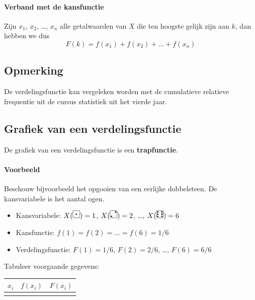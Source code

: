 \documentclass[a4paper,12pt, twoside]{article}
\newcommand{\dice}[1]{
\begin{tikzpicture}[x=1em,y=1em,radius=0.1]
  \draw[rounded corners=1] (0,0) rectangle (1,1);
  \ifodd#1
    \fill (0.5,0.5) circle;
  \fi
  \ifnum#1>1
    \fill (0.2,0.2) circle;
    \fill (0.8,0.8) circle;
   \ifnum#1>3
     \fill (0.2,0.8) circle;
     \fill (0.8,0.2) circle;
    \ifnum#1>5
      \fill (0.8,0.5) circle;
      \fill (0.2,0.5) circle;
    \fi
  \fi
\fi
\end{tikzpicture}
}
\begin{document}
\paragraph*{Verband met de kansfunctie}
Zijn $x_1$, $x_2$, \ldots, $x_n$ alle getalwaarden van $X$ die ten hoogste gelijk zijn aan $k$, dan hebben we dus
$$F(k) = f(x_1) + f(x_2) + \ldots + f(x_n)$$

\subsection{Opmerking}

De verdelingsfunctie kan vergeleken worden met de cumulatieve relatieve frequentie uit de cursus statistiek uit het vierde jaar.

\subsection{Grafiek van een verdelingsfunctie}

De grafiek van een verdelingsfunctie is een {\bf trapfunctie}.

\paragraph*{Voorbeeld} Beschouw bijvoorbeeld het opgooien van een eerlijke dobbelsteen. De kansvariabele is het aantal ogen.
\begin{itemize}
  \item Kansvariabele: $X(\dice{1})=1$, $X(\dice{2})=2$, \ldots, $X(\dice{6})=6$
  \item Kansfunctie: $f(1)=f(2)=\ldots=f(6)=1/6$
  \item Verdelingsfunctie: $F(1)=1/6$, $F(2)=2/6$, \ldots, $F(6)=6/6$
\end{itemize}

\begin{oefening}
Tabuleer voorgaande gegevens:
\begin{center}
  \begin{tabular}{c|c|c}
    $x_i$ & $f(x_i)$ & $F(x_i)$\\
    \hline
    & &\\[3.5cm]
  \end{tabular}
\end{center}
\end{oefening}
\end{document}
